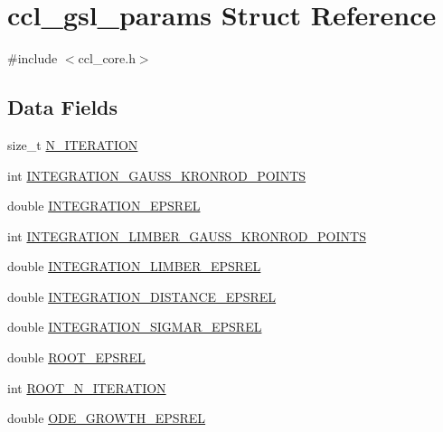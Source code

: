 \hypertarget{structccl__gsl__params}{}\section{ccl\+\_\+gsl\+\_\+params Struct Reference}
\label{structccl__gsl__params}


{\ttfamily \#include $<$ccl\+\_\+core.\+h$>$}

\subsection*{Data Fields}
\begin{DoxyCompactItemize}
\item 
size\+\_\+t \mbox{\hyperlink{structccl__gsl__params_a3d4b0770fae9aee9532d1eec1a746e29}{N\+\_\+\+I\+T\+E\+R\+A\+T\+I\+ON}}
\item 
int \mbox{\hyperlink{structccl__gsl__params_ab7e95b914fb0d624d0fbacb2839c9d02}{I\+N\+T\+E\+G\+R\+A\+T\+I\+O\+N\+\_\+\+G\+A\+U\+S\+S\+\_\+\+K\+R\+O\+N\+R\+O\+D\+\_\+\+P\+O\+I\+N\+TS}}
\item 
double \mbox{\hyperlink{structccl__gsl__params_a3ff3cc499e2749ba6338e09d8fe6d7b3}{I\+N\+T\+E\+G\+R\+A\+T\+I\+O\+N\+\_\+\+E\+P\+S\+R\+EL}}
\item 
int \mbox{\hyperlink{structccl__gsl__params_a7d3af7791d000e52ec3e2dee7d5cb603}{I\+N\+T\+E\+G\+R\+A\+T\+I\+O\+N\+\_\+\+L\+I\+M\+B\+E\+R\+\_\+\+G\+A\+U\+S\+S\+\_\+\+K\+R\+O\+N\+R\+O\+D\+\_\+\+P\+O\+I\+N\+TS}}
\item 
double \mbox{\hyperlink{structccl__gsl__params_a4ac4468ad1a81aa9aa007980db4fb6fe}{I\+N\+T\+E\+G\+R\+A\+T\+I\+O\+N\+\_\+\+L\+I\+M\+B\+E\+R\+\_\+\+E\+P\+S\+R\+EL}}
\item 
double \mbox{\hyperlink{structccl__gsl__params_ac4e4045cb45a81212b56965e1992681f}{I\+N\+T\+E\+G\+R\+A\+T\+I\+O\+N\+\_\+\+D\+I\+S\+T\+A\+N\+C\+E\+\_\+\+E\+P\+S\+R\+EL}}
\item 
double \mbox{\hyperlink{structccl__gsl__params_ad1542f0ceecfe7f108ce9ccc101f7a12}{I\+N\+T\+E\+G\+R\+A\+T\+I\+O\+N\+\_\+\+S\+I\+G\+M\+A\+R\+\_\+\+E\+P\+S\+R\+EL}}
\item 
double \mbox{\hyperlink{structccl__gsl__params_a05a7e4f6e9ce2c8697d6092de33ecf34}{R\+O\+O\+T\+\_\+\+E\+P\+S\+R\+EL}}
\item 
int \mbox{\hyperlink{structccl__gsl__params_a9d13f40efe43c9eec1ea1f3c74798a47}{R\+O\+O\+T\+\_\+\+N\+\_\+\+I\+T\+E\+R\+A\+T\+I\+ON}}
\item 
double \mbox{\hyperlink{structccl__gsl__params_a17b67de63575e4dcf03a67a68ad527e7}{O\+D\+E\+\_\+\+G\+R\+O\+W\+T\+H\+\_\+\+E\+P\+S\+R\+EL}}

\end{DoxyCompactItemize}
